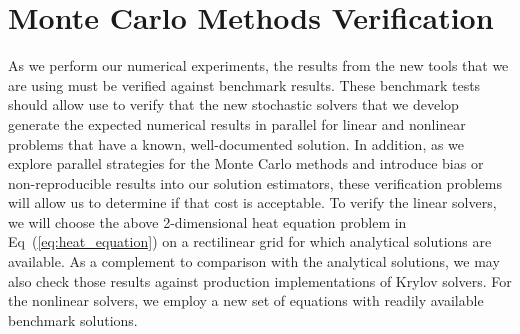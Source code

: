 \section{Monte Carlo Methods Verification}
\label{sec:method_verification}
As we perform our numerical experiments, the results from the new
tools that we are using must be verified against benchmark
results. These benchmark tests should allow use to verify that the new
stochastic solvers that we develop generate the expected numerical
results in parallel for linear and nonlinear problems that have a
known, well-documented solution. In addition, as we explore parallel
strategies for the Monte Carlo methods and introduce bias or
non-reproducible results into our solution estimators, these
verification problems will allow us to determine if that cost is
acceptable. To verify the linear solvers, we will choose the above
2-dimensional heat equation problem in Eq~(\ref{eq:heat_equation}) on
a rectilinear grid for which analytical solutions are available. As a
complement to comparison with the analytical solutions, we may also
check those results against production implementations of Krylov
solvers. For the nonlinear solvers, we employ a new set of equations
with readily available benchmark solutions.

